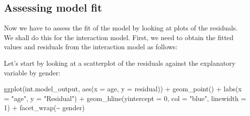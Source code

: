 \documentclass[
  letterpaper,
  DIV=11,
  numbers=noendperiod]{scrartcl}
\newenvironment{Shaded}{\begin{snugshade}}{\end{snugshade}}
\newcommand{\AttributeTok}[1]{\textcolor[rgb]{0.40,0.45,0.13}{#1}}
\newcommand{\DecValTok}[1]{\textcolor[rgb]{0.68,0.00,0.00}{#1}}
\newcommand{\FunctionTok}[1]{\textcolor[rgb]{0.28,0.35,0.67}{#1}}
\newcommand{\NormalTok}[1]{\textcolor[rgb]{0.00,0.23,0.31}{#1}}
\newcommand{\OtherTok}[1]{\textcolor[rgb]{0.00,0.23,0.31}{#1}}
\newcommand{\SpecialCharTok}[1]{\textcolor[rgb]{0.37,0.37,0.37}{#1}}
\newcommand{\StringTok}[1]{\textcolor[rgb]{0.13,0.47,0.30}{#1}}
\begin{document}
\subsection{Assessing model fit}\label{assessing-model-fit}

Now we have to assess the fit of the model by looking at plots of the
residuals. We shall do this for the interaction model. First, we need to
obtain the fitted values and residuals from the interaction model as
follows:

\begin{Shaded}
\end{Shaded}

Let's start by looking at a scatterplot of the residuals against the
explanatory variable by gender:

\begin{Shaded}
\begin{Highlighting}[]
\FunctionTok{ggplot}\NormalTok{(int.model\_output, }\FunctionTok{aes}\NormalTok{(}\AttributeTok{x =}\NormalTok{ age, }\AttributeTok{y =}\NormalTok{ residual)) }\SpecialCharTok{+}
  \FunctionTok{geom\_point}\NormalTok{() }\SpecialCharTok{+}
  \FunctionTok{labs}\NormalTok{(}\AttributeTok{x =} \StringTok{"age"}\NormalTok{, }\AttributeTok{y =} \StringTok{"Residual"}\NormalTok{) }\SpecialCharTok{+}
  \FunctionTok{geom\_hline}\NormalTok{(}\AttributeTok{yintercept =} \DecValTok{0}\NormalTok{, }\AttributeTok{col =} \StringTok{"blue"}\NormalTok{, }\AttributeTok{linewidth =} \DecValTok{1}\NormalTok{) }\SpecialCharTok{+}
  \FunctionTok{facet\_wrap}\NormalTok{(}\SpecialCharTok{\textasciitilde{}}\NormalTok{ gender)}
\end{Highlighting}
\end{Shaded}
\end{document}
